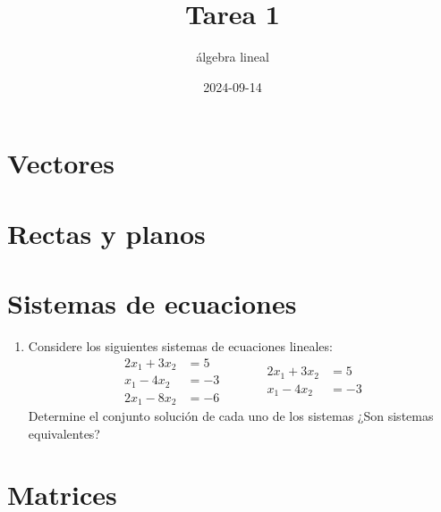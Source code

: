 \documentclass[
]{article}
\title{Tarea 1}
\author{álgebra lineal}
\date{2024-09-14}
\providecommand{\tightlist}{%
  \setlength{\itemsep}{0pt}\setlength{\parskip}{0pt}}
\begin{document}
\maketitle

\section{Vectores}\label{vectores}

\section{Rectas y planos}\label{rectas-y-planos}

\section{Sistemas de ecuaciones}\label{sistemas-de-ecuaciones}

\begin{enumerate}
\def\labelenumi{\arabic{enumi}.}
\tightlist
\item
  Considere los siguientes sistemas de ecuaciones lineales: \[
  \begin{array}{cc}
    2x_1 + 3x_2 &= 5 \\
    x_1  - 4x_2 &= -3 \\
    2x_1 - 8x_2 & = -6
  \end{array} 
  \quad \quad \quad
  \begin{array}{cc}
    2x_1 + 3x_2 &= 5 \\
    x_1  - 4x_2 &= -3 
  \end{array}
  \] Determine el conjunto solución de cada uno de los sistemas ¿Son
  sistemas equivalentes?
\end{enumerate}

\section{Matrices}\label{matrices}
\end{document}

